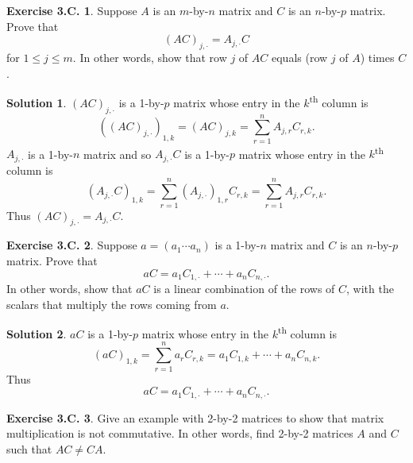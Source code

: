 \documentclass[12pt]{article}
\theoremstyle{definition}
\theoremstyle{exercise}
\newtheorem{exercise}{Exercise 3.C.}
\theoremstyle{solution}
\newtheorem*{solution}{Solution}
\newcommand{\ts}{\textsuperscript}
\begin{document}
\begin{exercise}
\label{ex:10}
    Suppose \( A \) is an \(m\)-by-\(n\) matrix and \( C \) is an \(n\)-by-\(p\) matrix. Prove that
    \[
        (AC)_{j,\cdot} = A_{j,\cdot} C
    \]
    for \( 1 \leq j \leq m \). In other words, show that row \( j \) of \( AC \) equals (row \( j \) of \( A \)) times \( C \).
\end{exercise}

\begin{solution}
    \( (AC)_{j,\cdot} \) is a 1-by-\(p\) matrix whose entry in the \(k\)\ts{th} column is
    \[
        ((AC)_{j,\cdot})_{1,k} = (AC)_{j,k} = \sum_{r=1}^n A_{j,r} C_{r,k}.
    \]
    \( A_{j,\cdot} \) is a 1-by-\(n\) matrix and so \( A_{j,\cdot} C \) is a 1-by-\(p\) matrix whose entry in the \(k\)\ts{th} column is
    \[
        (A_{j,\cdot} C)_{1,k} = \sum_{r=1}^n (A_{j,\cdot})_{1,r} C_{r,k} = \sum_{r=1}^n A_{j,r} C_{r,k}.
    \]
    Thus \( (AC)_{j,\cdot} = A_{j,\cdot} C \).
\end{solution}

\begin{exercise}
\label{ex:11}
    Suppose \( a = ( a_1 \cdots a_n ) \) is a 1-by-\(n\) matrix and \( C \) is an \(n\)-by-\(p\) matrix. Prove that
    \[
        aC = a_1 C_{1,\cdot} + \cdots + a_n C_{n,\cdot}.
    \]
    In other words, show that \( aC \) is a linear combination of the rows of \( C \), with the scalars that multiply the rows coming from \( a \).
\end{exercise}

\begin{solution}
    \( aC \) is a 1-by-\(p\) matrix whose entry in the \(k\)\ts{th} column is
    \[
        (aC)_{1,k} = \sum_{r=1}^n a_r C_{r,k} = a_1 C_{1,k} + \cdots + a_n C_{n,k}.
    \]
    Thus
    \[
        aC = a_1 C_{1,\cdot} + \cdots + a_n C_{n,\cdot}.
    \]
\end{solution}

\begin{exercise}
\label{ex:12}
    Give an example with 2-by-2 matrices to show that matrix multiplication is not commutative. In other words, find 2-by-2 matrices \( A \) and \( C \) such that \( AC \neq CA \).
\end{exercise}
\end{document}
